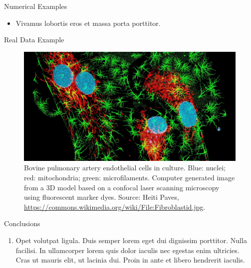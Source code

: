 \documentclass{beamer} %
\begin{document}
\begin{frame}[t]
\begin{columns}[t]
\begin{column}{0.465\textwidth}
\begin{block}{Numerical Examples}
	\bigskip\bigskip %
	
	\begin{itemize}
		\item Vivamus lobortis eros et massa porta porttitor.
	\end{itemize}
\end{block}


\begin{block}{Real Data Example}
	\begin{figure}
		\includegraphics[width=\linewidth]{Fibroblastid.jpg}
		\caption{Bovine pulmonary artery endothelial cells in culture. Blue: nuclei; red: mitochondria; green: microfilaments. Computer generated image from a 3D model based on a confocal laser scanning microscopy using fluorescent marker dyes. Source: Heiti Paves, \url{https://commons.wikimedia.org/wiki/File:Fibroblastid.jpg}.}
	\end{figure}
\end{block}


\begin{block}{Conclusions}
	\begin{enumerate}
		\item \alert{Opet volutpat ligula.} Duis semper lorem eget dui dignissim porttitor. Nulla facilisi. In ullamcorper lorem quis dolor iaculis nec egestas enim ultricies. Cras ut mauris elit, ut lacinia dui. Proin in ante et libero hendrerit iaculis.
	\end{enumerate}
\end{block}



\end{column}
\end{columns}
\end{frame}
\end{document}
